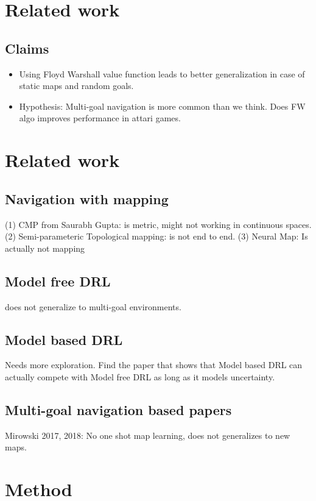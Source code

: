 \documentclass[letterpaper]{article} %
\begin{document}
\section{Related work}
\subsection{Claims}
\begin{itemize} \item
Using Floyd Warshall value function leads to better generalization in case of static maps and
random goals.
\item
Hypothesis: Multi-goal navigation is more common than we think. Does FW algo improves performance in attari games.
\end{itemize}

\section{Related work}
\subsection{Navigation with mapping}
 (1) CMP from Saurabh Gupta: is metric, might not working in continuous spaces.
 (2) Semi-parameteric Topological mapping: is not end to end.
 (3) Neural Map: Is actually not mapping

\subsection{Model free DRL }
does not generalize to multi-goal environments.

\subsection{Model based DRL}
Needs more exploration.
Find the paper that shows that Model based DRL can actually compete with Model free DRL as long as it models uncertainty.

\subsection{Multi-goal navigation based papers}
Mirowski 2017, 2018: No one shot map learning, does not generalizes to new maps.


\section{Method}
\end{document}
